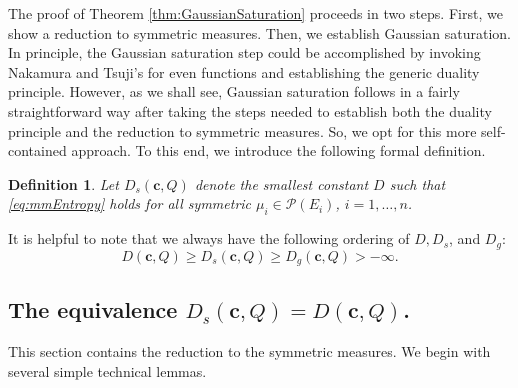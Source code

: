 \documentclass[10pt]{article}
\newtheorem{definition}[theorem]{Definition}
\begin{document}
The proof of Theorem \ref{thm:GaussianSaturation} proceeds in two steps.  First, we show a reduction to symmetric measures.  Then, we establish Gaussian saturation. In principle, the Gaussian saturation step could be accomplished by invoking Nakamura and Tsuji's \cite[Theorem 1.1]{NT} for even functions and establishing the generic duality principle.  However, as we shall see, Gaussian saturation  follows in a fairly straightforward way after taking the steps needed to establish both the duality principle and the reduction to symmetric measures.  So, we opt for this more self-contained approach.  
To this end, we introduce the following formal definition.
\begin{definition}
Let $D_s(\mathbf{c},Q)$ denote the smallest constant $D$ such that \eqref{eq:mmEntropy} holds for all symmetric $\mu_i \in \mathcal{P}(E_i)$, $i=1,\dots, n$.
\end{definition}
It is helpful to note that we always have the following ordering of $D, D_s$, and $D_g$:
$$
D(\mathbf{c},Q) \geq D_s(\mathbf{c},Q) \geq D_g(\mathbf{c},Q) > -\infty.
$$



\subsection{The equivalence $D_s(\mathbf{c},Q) = D(\mathbf{c},Q)$.}

This section contains the reduction to the symmetric measures.  We begin with several simple technical lemmas. 
\end{document}
